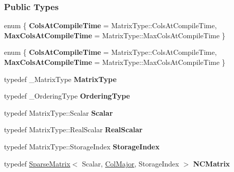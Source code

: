 \subsubsection*{Public Types}
\begin{DoxyCompactItemize}
\item 
\mbox{\label{group___sparse_l_u___module_ae56aeb2b5cd0ef30339aa2f173da927f}} 
enum \{ {\bfseries Cols\+At\+Compile\+Time} = Matrix\+Type\+:\+:Cols\+At\+Compile\+Time, 
{\bfseries Max\+Cols\+At\+Compile\+Time} = Matrix\+Type\+:\+:Max\+Cols\+At\+Compile\+Time
 \}
\item 
\mbox{\label{group___sparse_l_u___module_ae9965233f57075d73957f5b0b712cc43}} 
enum \{ {\bfseries Cols\+At\+Compile\+Time} = Matrix\+Type\+:\+:Cols\+At\+Compile\+Time, 
{\bfseries Max\+Cols\+At\+Compile\+Time} = Matrix\+Type\+:\+:Max\+Cols\+At\+Compile\+Time
 \}
\item 
\mbox{\label{group___sparse_l_u___module_afde6955eb546fc127e96ad2c1fc087e2}} 
typedef \+\_\+\+Matrix\+Type {\bfseries Matrix\+Type}
\item 
\mbox{\label{group___sparse_l_u___module_a2e2e51e8f3e71a9fec516aaecef7b778}} 
typedef \+\_\+\+Ordering\+Type {\bfseries Ordering\+Type}
\item 
\mbox{\label{group___sparse_l_u___module_a105a0173a3e2ff548bc643c7c4f6c149}} 
typedef Matrix\+Type\+::\+Scalar {\bfseries Scalar}
\item 
\mbox{\label{group___sparse_l_u___module_a7569faba9d46aee2e8ffcf396bf09089}} 
typedef Matrix\+Type\+::\+Real\+Scalar {\bfseries Real\+Scalar}
\item 
\mbox{\label{group___sparse_l_u___module_a8111a1271e3ba9a4995ff78837d816f5}} 
typedef Matrix\+Type\+::\+Storage\+Index {\bfseries Storage\+Index}
\item 
\mbox{\label{group___sparse_l_u___module_af1fb9b86b237b26d2148df843bc41220}} 
typedef \hyperlink{group___sparse_core___module_class_eigen_1_1_sparse_matrix}{Sparse\+Matrix}$<$ Scalar, \hyperlink{group__enums_ggaacded1a18ae58b0f554751f6cdf9eb13a0cbd4bdd0abcfc0224c5fcb5e4f6669a}{Col\+Major}, Storage\+Index $>$ {\bfseries N\+C\+Matrix}

\end{DoxyCompactItemize}
